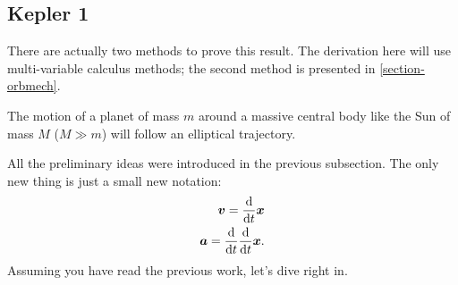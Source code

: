 \subsection{Kepler 1}\label{subsection-K1}
There are actually two methods to prove this result. The derivation here will use multi-variable calculus methods; the second method is presented in \ref{section-orbmech}.
\begin{theorem}
The motion of a planet of mass $m$ around a massive central body like the Sun of mass $M$ ($M \gg m$) will follow an elliptical trajectory.
\end{theorem}
All the preliminary ideas were introduced in the previous subsection. The only new thing is just a small new notation: 
\begin{align}
    \bm v = \frac{\mathrm{d}}{\mathrm{d}t}{\bm x} \\
    \bm a = \frac{\mathrm{d}}{\mathrm{d}t}\frac{\mathrm{d}}{\mathrm{d}t}{\bm x}.
\end{align}
Assuming you have read the previous work, let's dive right in. 
